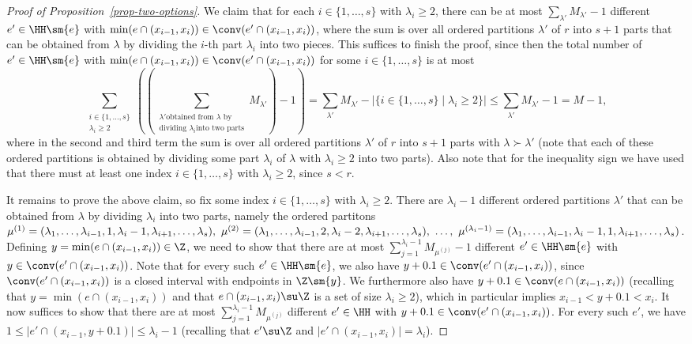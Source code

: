\begin{proof}[Proof of Proposition~\ref{prop-two-options}]
We claim that for each $i\in\{1,\dots,s\}$ with $\lambda_i\ge 2$, there can be at most $\sum_{\lambda'} M_{\lambda'}-1$ different $e'\in\HH\sm\{e\}$ with $\min(e\cap (x_{i-1},x_i))\in \conv(e'\cap (x_{i-1},x_i))$, where the sum is over all ordered partitions $\lambda'$ of $r$ into $s+1$ parts that can be obtained from $\lambda$ by dividing the $i$-th part $\lambda_i$ into two pieces. This suffices to finish the proof, since then the total number of $e'\in\HH\sm\{e\}$ with $\min(e\cap (x_{i-1},x_i))\in \conv(e'\cap (x_{i-1},x_i))$ for some $i\in\{1,\dots,s\}$ is at most
\[\sum_{\substack{i\in\{1,\dots,s\}\\\lambda_i\ge 2}}\left(\left(\sum_{\substack{\lambda'\text{obtained from }\lambda\text{ by}\\\text{dividing }\lambda_i\text{into two parts}}}\!\!M_{\lambda'}\right)-1\right)=\sum_{\lambda'} M_{\lambda'}-|\{i\in\{1,\dots,s\}\mid \lambda_i\ge 2\}|\le \sum_{\lambda'} M_{\lambda'}-1=M-1,\]
where in the second and third term the sum is over all ordered partitions $\lambda'$ of $r$ into $s+1$ parts with $\lambda\succ\lambda'$ (note that each of these ordered partitions is obtained by dividing some part $\lambda_i$ of $\lambda$ with $\lambda_i\ge 2$ into two parts). Also note that for the inequality sign we have used that there must at least one index $i\in \{1,\dots,s\}$ with $\lambda_i\ge 2$, since $s<r$.

It remains to prove the above claim, so fix some index $i\in\{1,\dots,s\}$ with $\lambda_i\ge 2$. There are $\lambda_i-1$ different ordered partitions $\lambda'$ that can be obtained from $\lambda$ by dividing $\lambda_i$ into two parts, namely the ordered partitons $\mu^{(1)}=(\lambda_1,\dots,\lambda_{i-1},1,\lambda_i-1,\lambda_{i+1},\dots,\lambda_s), \ \mu^{(2)}=(\lambda_1,\dots,\lambda_{i-1},2,\lambda_i-2,\lambda_{i+1},\dots,\lambda_s),\ \dots,\ \linebreak \mu^{(\lambda_i-1)}=(\lambda_1,\dots,\lambda_{i-1},\lambda_i-1,1,\lambda_{i+1},\dots,\lambda_s)$. Defining $y=\min(e\cap (x_{i-1},x_i))\in \Z$, we need to show that there are at most $\sum_{j=1}^{\lambda_i-1} M_{\mu^{(j)}}-1$ different $e'\in\HH\sm\{e\}$ with $y\in \conv(e'\cap (x_{i-1},x_i))$. Note that for every such $e'\in\HH\sm\{e\}$, we also have $y+0.1\in \conv(e'\cap (x_{i-1},x_i))$, since $\conv(e'\cap (x_{i-1},x_i))$ is a closed interval with endpoints in $\Z\sm\{y\}$. We furthermore also have $y+0.1\in \conv(e\cap (x_{i-1},x_i))$ (recalling that $y=\min(e\cap (x_{i-1},x_i))$ and that $e\cap (x_{i-1},x_i)\su \Z$ is a set of size $\lambda_i\ge 2$), which in particular implies $x_{i-1}<y+0.1<x_i$. It now suffices to show that there are at most $\sum_{j=1}^{\lambda_i-1} M_{\mu^{(j)}}$ different $e'\in\HH$ with $y+0.1\in \conv(e'\cap (x_{i-1},x_i))$. For every such $e'$, we have $1\le |e'\cap (x_{i-1},y+0.1)|\le \lambda_i-1$ (recalling that $e'\su \Z$ and $|e'\cap (x_{i-1},x_i)|=\lambda_i$).


\end{proof}
